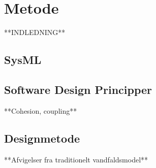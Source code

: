 \chapter{Metode}
**INDLEDNING**

\section{SysML}

\section{Software Design Principper}

**Cohesion, coupling**

\section{Designmetode}

**Afvigelser fra traditionelt vandfaldsmodel**